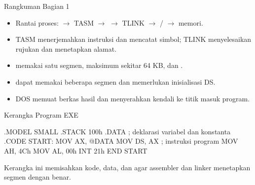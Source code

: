 \documentclass[aspectratio=169,11pt]{beamer}
\begin{document}
\begin{frame}{Rangkuman Bagian 1}
\small
\begin{itemize}
    \item Rantai proses:  $\rightarrow$ TASM
          $\rightarrow$  $\rightarrow$ TLINK
          $\rightarrow$ / $\rightarrow$ memori.

    \vspace{0.15em}
    \item TASM menerjemahkan instruksi dan mencatat simbol; TLINK
          menyelesaikan rujukan dan menetapkan alamat.

    \vspace{0.15em}
    \item {} memakai satu segmen, maksimum sekitar 64 KB,
          dan .

    \vspace{0.15em}
    \item {} dapat memakai beberapa segmen dan memerlukan
          inisialisasi DS.

    \vspace{0.15em}
    \item DOS memuat berkas hasil dan menyerahkan kendali ke titik
          masuk program.
\end{itemize}
\end{frame}


\begin{frame}[fragile]{Kerangka Program EXE}
\begin{kodeasm}
.MODEL SMALL
.STACK 100h
.DATA
    ; deklarasi variabel dan konstanta
.CODE
START:
    MOV AX, @DATA
    MOV DS, AX
    ; instruksi program
    MOV AH, 4Ch
    MOV AL, 00h
    INT 21h
END START
\end{kodeasm}

\vspace{0.1em}
{\footnotesize\color{obeGray}Kerangka ini memisahkan kode, data, dan
 agar assembler dan linker menetapkan segmen dengan
benar.\par}
\end{frame}
\end{document}
